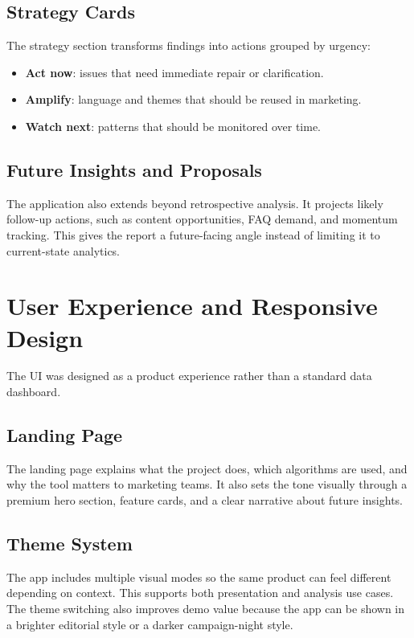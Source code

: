\subsection{Strategy Cards}
The strategy section transforms findings into actions grouped by urgency:
\begin{itemize}
    \item \textbf{Act now}: issues that need immediate repair or clarification.
    \item \textbf{Amplify}: language and themes that should be reused in marketing.
    \item \textbf{Watch next}: patterns that should be monitored over time.
\end{itemize}

\subsection{Future Insights and Proposals}
The application also extends beyond retrospective analysis. It projects likely follow-up actions, such as content opportunities, FAQ demand, and momentum tracking. This gives the report a future-facing angle instead of limiting it to current-state analytics.

\section{User Experience and Responsive Design}
The UI was designed as a product experience rather than a standard data dashboard.

\subsection{Landing Page}
The landing page explains what the project does, which algorithms are used, and why the tool matters to marketing teams. It also sets the tone visually through a premium hero section, feature cards, and a clear narrative about future insights.

\subsection{Theme System}
The app includes multiple visual modes so the same product can feel different depending on context. This supports both presentation and analysis use cases. The theme switching also improves demo value because the app can be shown in a brighter editorial style or a darker campaign-night style.

